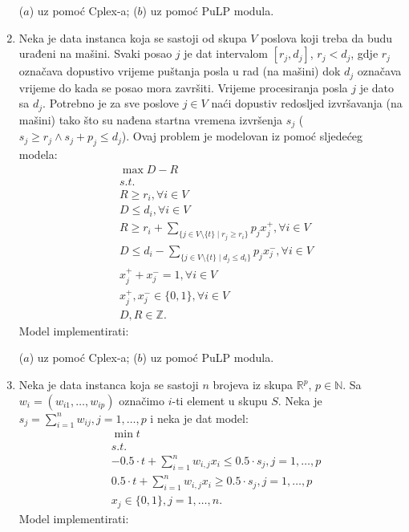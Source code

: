 \documentclass[a4paper, utf8, 11pt, colorlinks]{book}
\begin{document}
\begin{enumerate}
      ($a$) uz pomoć Cplex-a; ($b$) uz pomoć PuLP modula. 
   \item   %
   Neka je data instanca koja se sastoji od skupa $V$ poslova koji treba da budu urađeni na mašini. Svaki posao $j$ je dat intervalom $[r_j, d_j]$, $r_j < d_j$, gdje $r_j$ označava dopustivo vrijeme puštanja posla u rad (na mašini) dok $d_j$ označava vrijeme do kada se posao mora završiti.  Vrijeme procesiranja posla $j$ je dato sa $d_j$. 
   Potrebno je za sve poslove $j  \in V$ naći dopustiv redosljed izvršavanja (na mašini) tako što su nađena startna vremena izvršenja $s_j$ ($s_j \geq r_j \wedge s_j + p_j \leq d_j$). Ovaj problem je modelovan iz pomoć sljedećeg modela:
   \begin{align*}
          &\max D - R \\
          & s.t. \\
          & R \geq r_i, \forall i \in V \\
          & D \leq d_i, \forall i \in V \\
          & R \geq r_i + \sum_{ \{ j \in V \setminus \{t\} \mid r_j \geq r_i \} } p_j x_j^+, \forall i \in V \\
          & D \leq d_i -  \sum_{ \{ j \in V \setminus \{t\} \mid d_j \leq d_i \}} p_j x_j^-, \forall i \in V \\
          & x_j^+ + x_j^-  = 1, \forall i \in V \\
          &   x_j^+, x_j^- \in \{0, 1\}, \forall i \in V \\
          & D, R \in \mathbb{Z}. 
   \end{align*} 
          Model implementirati:
    
    ($a$) uz pomoć Cplex-a; ($b$) uz pomoć PuLP modula. 
    \item Neka je data instanca koja se sastoji  $n$ brojeva iz skupa $\mathbb{R}^p$, $p\in \mathbb{N}$. Sa $w_{i}=(w_{i1},\ldots, w_{ip})$ označimo $i$-ti element u skupu $S$. 
    Neka je $s_j = \sum_{i=1}^n w_{ij}, j=1,\ldots, p$ i neka je dat model:
    \begin{align*}
    	&\min t  \\
    	& s.t. \\
    	&-0.5 \cdot t + \sum_{i=1}^n w_{i,j}    x_i  \leq 0.5 \cdot s_j, j=1,\ldots,p \\
    	& 0.5 \cdot t + \sum_{i=1}^n w_{i,j} x_i  \geq 0.5 \cdot s_j, j=1,\ldots,p \\
    	& x_j \in \{0, 1\}, j = 1,\ldots,n.
    \end{align*}
             Model implementirati:
     

\end{enumerate}
\end{document}
